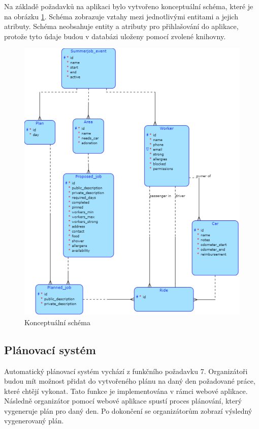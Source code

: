 Na základě požadavků na aplikaci bylo vytvořeno konceptuální schéma, které je na obrázku \ref{fig:schema}. Schéma zobrazuje vztahy mezi jednotlivými entitami a jejich atributy.
Schéma neobsahuje entity a atributy pro přihlašování do aplikace, protože tyto údaje budou v databázi uloženy pomocí zvolené knihovny.

\begin{figure}[h]
    \centering
    \includegraphics[width=\textwidth]{chapters/images/schema}
    \caption{Konceptuální schéma}
    \label{fig:schema}
\end{figure}


\subsection{Plánovací systém}

Automatický plánovací systém vychází z funkčního požadavku 7. Organizátoři budou mít možnost přidat do vytvořeného plánu na daný den požadované práce, které
chtějí vykonat. Tato funkce je implementována v rámci webové aplikace. Následně organizátor pomocí webové aplikace spustí proces plánování, který vygeneruje plán pro
daný den. Po dokončení se organizátorům zobrazí výsledný vygenerovaný plán.


